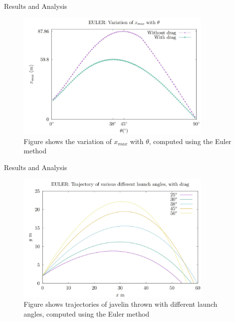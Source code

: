 \documentclass{beamer}
\begin{document}
\begin{frame}{Results and Analysis}
    \begin{figure}
    \centering
    \includegraphics[width=0.85\textwidth]{fig11.JPG}
    \caption{Figure shows the variation of $x_{max}$ with $\theta$, computed using the Euler method}
    \label{fig:fig11.JPEG}
\end{figure}
\end{frame}
\begin{frame}{Results and Analysis}
    \begin{figure}
    \centering
    \includegraphics[width=0.85\textwidth]{fig22.JPG}
    \caption{Figure shows trajectories of javelin thrown with different launch angles, computed using the Euler method}
    \label{fig:fig22.JPEG}
\end{figure}
\end{frame}
\end{document}
